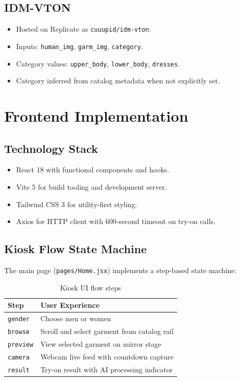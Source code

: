 \subsection{IDM-VTON}

\begin{itemize}[leftmargin=*]
  \item Hosted on Replicate as \texttt{cuuupid/idm-vton}.
  \item Inputs: \texttt{human\_img}, \texttt{garm\_img}, \texttt{category}.
  \item Category values: \texttt{upper\_body}, \texttt{lower\_body}, \texttt{dresses}.
  \item Category inferred from catalog metadata when not explicitly set.
\end{itemize}

\section{Frontend Implementation}
\label{sec:frontend-implementation}

\subsection{Technology Stack}

\begin{itemize}[leftmargin=*]
  \item React 18 with functional components and hooks.
  \item Vite 5 for build tooling and development server.
  \item Tailwind CSS 3 for utility-first styling.
  \item Axios for HTTP client with 600-second timeout on try-on calls.
\end{itemize}

\subsection{Kiosk Flow State Machine}

The main page (\texttt{pages/Home.jsx}) implements a step-based state machine:

\begin{table}[H]
  \centering
  \caption{Kiosk UI flow steps}
  \label{tab:ui-steps}
  \begin{tabular}{@{}lp{10cm}@{}}
    \toprule
    \textbf{Step} & \textbf{User Experience} \\
    \midrule
    \texttt{gender} & Choose men or women \\
    \texttt{browse} & Scroll and select garment from catalog rail \\
    \texttt{preview} & View selected garment on mirror stage \\
    \texttt{camera} & Webcam live feed with countdown capture \\
    \texttt{result} & Try-on result with AI processing indicator \\
    \bottomrule
  \end{tabular}
\end{table}

